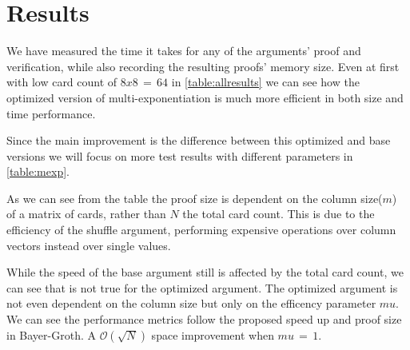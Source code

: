 \documentclass[12pt,a4paper]{report}
\begin{document}
\chapter{Results}
We have measured the time it takes for any of the arguments' proof and verification, while also recording the resulting proofs' memory size. 
Even at first with low card count of $8 x 8\,=\,64$ in \ref{table:allresults} we can see how the optimized version of multi-exponentiation is much more efficient in both size and time performance.\par
Since the main improvement is the difference between this optimized and base versions we will focus on more test results with different parameters in \ref{table:mexp}.\par
As we can see from the table the proof size is dependent on the column size($m$) of a matrix of cards, rather than $N$ the total card count.
This is due to the efficiency of the shuffle argument, performing expensive operations over column vectors instead over single values.\par
While the speed of the base argument still is affected by the total card count, we can see that is not true for the optimized argument. The optimized argument is not even dependent on the column size but only on the efficency parameter $mu$.
We can see the performance metrics follow the proposed speed up and proof size in Bayer-Groth. A $\mathcal{O}(\sqrt{N})$\cite{bgshuffle} space improvement when $mu\,=\,1$.\par
\end{document}
